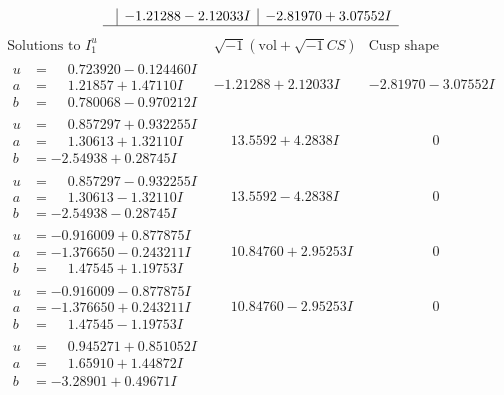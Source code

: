\documentclass[1p]{elsarticle_modified}
\theoremstyle{definition}
\newcommand{\I}{\sqrt{-1}}
\begin{document}
$$\begin{array}{c|c|c}
 & -1.21288 - 2.12033 I & -2.81970 + 3.07552 I\\
 \hline 
 \end{array}$$\newpage$$\begin{array}{c|c|c}  
\text{Solutions to }I^u_{1}& \I (\text{vol} + \sqrt{-1}CS) & \text{Cusp shape}\\
 \hline 
\begin{aligned}
u &= \phantom{-}0.723920 - 0.124460 I \\
a &= \phantom{-}1.21857 + 1.47110 I \\
b &= \phantom{-}0.780068 - 0.970212 I\end{aligned}
 & -1.21288 + 2.12033 I & -2.81970 - 3.07552 I \\ \hline\begin{aligned}
u &= \phantom{-}0.857297 + 0.932255 I \\
a &= \phantom{-}1.30613 + 1.32110 I \\
b &= -2.54938 + 0.28745 I\end{aligned}
 & \phantom{-}13.5592 + 4.2838 I & \phantom{-0.000000 } 0 \\ \hline\begin{aligned}
u &= \phantom{-}0.857297 - 0.932255 I \\
a &= \phantom{-}1.30613 - 1.32110 I \\
b &= -2.54938 - 0.28745 I\end{aligned}
 & \phantom{-}13.5592 - 4.2838 I & \phantom{-0.000000 } 0 \\ \hline\begin{aligned}
u &= -0.916009 + 0.877875 I \\
a &= -1.376650 - 0.243211 I \\
b &= \phantom{-}1.47545 + 1.19753 I\end{aligned}
 & \phantom{-}10.84760 + 2.95253 I & \phantom{-0.000000 } 0 \\ \hline\begin{aligned}
u &= -0.916009 - 0.877875 I \\
a &= -1.376650 + 0.243211 I \\
b &= \phantom{-}1.47545 - 1.19753 I\end{aligned}
 & \phantom{-}10.84760 - 2.95253 I & \phantom{-0.000000 } 0 \\ \hline\begin{aligned}
u &= \phantom{-}0.945271 + 0.851052 I \\
a &= \phantom{-}1.65910 + 1.44872 I \\
b &= -3.28901 + 0.49671 I\end{aligned}

\end{array}$$
\end{document}
